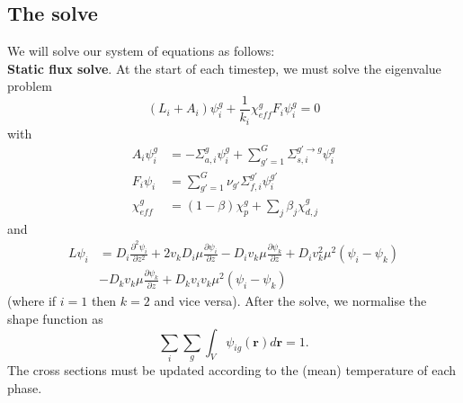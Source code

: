 \documentclass[12pt]{article}
\begin{document}
\subsection{The solve}
We will solve our system of equations as follows: \\

\noindent \textbf{Static flux solve}. At the start of each timestep, we must solve the eigenvalue problem
\begin{equation}
    (L_i+A_i) \psi_i^g+\frac{1}{k_i} \chi_{eff}^g F_i \psi_i ^g=0
\end{equation}
with 
\begin{align}
    A_i \psi_i ^g &=-\Sigma_{a,i}^g \psi_i ^g +\sum_{g'=1}^G \Sigma_{s,i}^{g'\rightarrow g}\psi_i ^g \\
    F_i \psi_i &= \sum_{g'=1}^G\nu_{g'}\Sigma_{f,i}^{g'} \psi_i ^{g'} \\
    \chi_{eff}^{g}&=(1-\beta)\chi_p^g +\sum_j\beta_j \chi_{d,j}^g
\end{align}
and 
\begin{align}
     L\psi_i&=D_i \frac{\partial^2 \psi_i}{\partial z^2} +2v_k D_i \mu \frac{\partial \psi_i}{\partial z}-D_i v_k \mu \frac{\partial \psi_k}{\partial z} +D_i v_k ^2 \mu^2 (\psi_i -\psi_k)\\&-D_k v_k \mu \frac{\partial \psi_k}{\partial z} +D_k v_i v_k \mu^2 (\psi_i-\psi_k)
\end{align}
(where if $i=1$ then $k=2$ and vice versa). After the solve, we normalise the shape function as
\begin{equation}
    \sum_i \sum_g \int _V \psi_{ig}(\mathbf{r})d\mathbf{r}=1.
\end{equation}
The cross sections must be updated according to the (mean) temperature of each phase. \\
\end{document}

